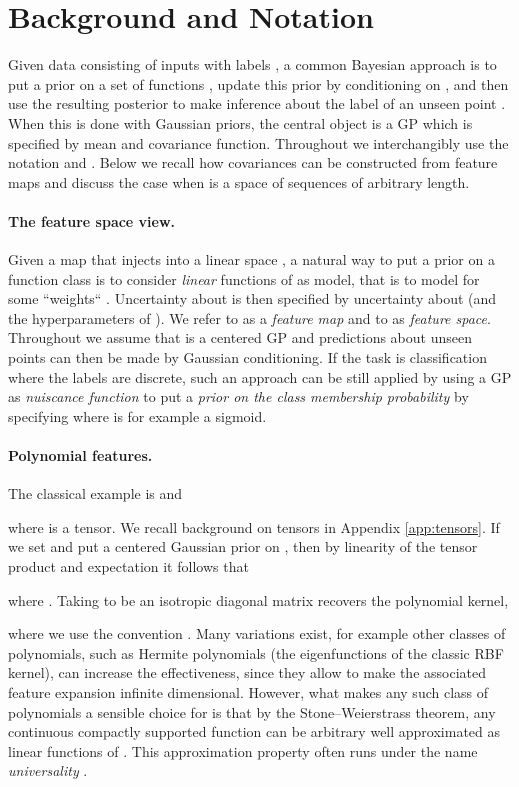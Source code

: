 \documentclass{article}
\begin{document}
\section{Background and Notation}\label{sec:background}
Given data  consisting of  inputs  with labels , a common Bayesian approach is to put a prior on a set of functions , update this prior by conditioning on , and then use the resulting posterior to make inference about the label  of an unseen point . 
When this is done with Gaussian priors, the central object is a GP  which is specified by mean and covariance function.
Throughout we interchangibly use the notation  and .
Below we recall how covariances can be constructed from feature maps and discuss the case when  is a space of sequences of arbitrary length.

\paragraph{The feature space view.}
Given a map  that injects  into a linear space , a natural way to put a prior on a function class  is to consider \emph{linear} functions of  as model, that is  to model  for some ``weights`` . Uncertainty about  is then specified by uncertainty about  (and the hyperparameters of ). 
We refer to  as a \emph{feature map} and to  as \emph{feature space}.
Throughout we assume that  is a centered GP and predictions about unseen points can then be made by Gaussian conditioning.    
If the task is classification where the labels  are discrete, such an approach can be still applied by using a GP  as \emph{nuiscance function} to put a \emph{prior on the class membership probability} by specifying  where  is for example a sigmoid.

\paragraph{Polynomial features.} 
The classical example is  and

where  is a tensor. 
We recall background on tensors in Appendix \ref{app:tensors}. 
If we set  and put a centered Gaussian prior on , then by linearity of the tensor product and expectation it follows that

where .
Taking  to be an isotropic diagonal matrix  recovers the polynomial kernel,

where we use the convention .
Many variations exist, for example other classes of polynomials, such as Hermite polynomials (the eigenfunctions of the classic RBF kernel), can increase the effectiveness, since they allow to make the associated feature expansion infinite dimensional.
However, what makes any such class of polynomials a sensible choice for  is that by the Stone--Weierstrass theorem, any continuous compactly supported function  can be arbitrary well approximated as linear functions of .
This approximation property often runs under the name \emph{universality} \cite{Micchelli2006Universal, sriperumbudur2011universality}.
\end{document}
